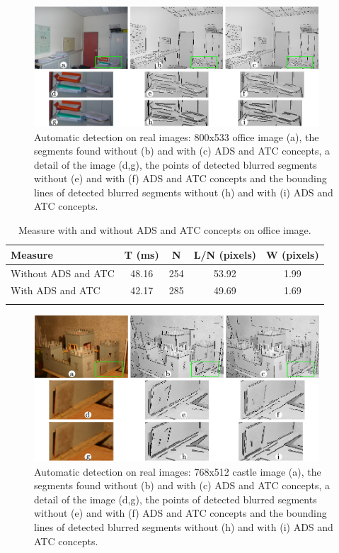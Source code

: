 \documentclass[11pt]{article}
\begin{document}
\begin{figure}
  \begin{center}
  \includegraphics[width=0.95\textwidth]{Images/expe1.png}
  \end{center}
  \caption{Automatic detection on real images: 800x533 office image (a), the segments found without (b) and with (c) ADS and ATC concepts, a detail of the image (d,g), the points of detected blurred segments without (e) and with (f) ADS and ATC concepts and the bounding lines of detected blurred segments without (h) and with (i) ADS and ATC concepts.}
\end{figure}



\begin{longtable}[]{@{}lcccc@{}}
\toprule
Measure & T (ms) & N & L/N (pixels) & W (pixels)\tabularnewline
\midrule 
Without ADS and ATC & 48.16 & 254 & 53.92 & 1.99\tabularnewline
With ADS and ATC & 42.17 & 285 & 49.69 & 1.69\tabularnewline
\bottomrule
\caption{Measure with and without ADS and ATC concepts on office
image.}
\end{longtable}





\begin{figure}
  \begin{center}
  \includegraphics[width=0.95\textwidth]{Images/expe2.png}
  \end{center}
  \caption{Automatic detection on real images: 768x512 castle image (a), the segments found without (b) and with (c) ADS and ATC concepts, a detail of the image (d,g), the points of detected blurred segments without (e) and with (f) ADS and ATC concepts and the bounding lines of detected blurred segments without (h) and with (i) ADS and ATC concepts.}
\end{figure}
\end{document}
